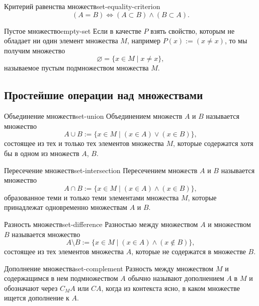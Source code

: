 \begin{properties}{Критерий равенства множеств}{set-equality-criterion}
  \[
    (A=B)\Leftrightarrow(A\subset B)\land(B\subset A).
  \]
\end{properties}

\begin{definition}{Пустое множество}{empty-set}
  Если в качестве $P$ взять свойство, которым не обладает ни один элемент
  множества $M$, например $P(x):=(x\ne x)$, то мы получим множество
  \[
    \varnothing=\{x\in M\mid x\ne x\},
  \]
  называемое пустым подмножеством множества $M$.
\end{definition}

\subsection{Простейшие операции над множествами}

\begin{definition}{Объединение множеств}{set-union}
  Объединением множеств $A$ и $B$ называется множество
  \[
    A\cup B:=\{x\in M\mid(x\in A)\lor(x\in B)\},
  \]
  состоящее из тех и только тех элементов множества $M$, которые содержатся
  хотя бы в одном из множеств $A$, $B$.
\end{definition}

\begin{definition}{Пересечение множеств}{set-intersection}
  Пересечением множеств $A$ и $B$ называется множество
  \[
    A\cap B:=\{x\in M\mid(x\in A)\land(x\in B)\},
  \]
  образованное теми и только теми элементами множества $M$, которые
  принадлежат одновременно множествам $A$ и $B$.
\end{definition}

\begin{definition}{Разность множеств}{set-difference}
  Разностью между множеством $A$ и множеством $B$ называется множество
  \[
    A\setminus B:=\{x\in M\mid(x\in A)\land(x\notin B)\},
  \]
  состоящее из тех элементов множества $A$, которые не содержатся в
  множестве $B$.
\end{definition}

\begin{definition}{Дополнение множества}{set-complement}
  Разность между множеством $M$ и содержащимся в нем подмножеством $A$
  обычно называют дополнением $A$ в $M$ и обозначают через $C_MA$ или $CA$,
  когда из контекста ясно, в каком множестве ищется дополнение к $A$.
\end{definition}

